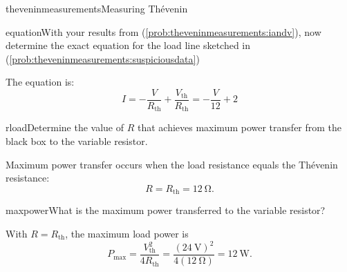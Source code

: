 \begin{mainquestion}{theveninmeasurements}{Measuring Thévenin}
\begin{partquestion}{equation}{With your results from (\cref{prob:theveninmeasurements:iandv}), now determine the exact equation for the load line sketched in (\cref{prob:theveninmeasurements:suspiciousdata}) }
\begin{answer}
The equation is:
\[
    I=-\frac{V}{R_\mathrm{th}}+\frac{V_\mathrm{th}}{R_\mathrm{th}}
      =-\frac{V}{12}+2
  \]
\end{answer}
\end{partquestion}
\begin{partquestion}{rload}{Determine the value of $R$ that achieves maximum power transfer from the black box to the variable resistor.}
\begin{answer}
Maximum power transfer occurs when the load resistance equals the Th\'evenin
  resistance:
  \[
    \boxed{R=R_{\mathrm{th}}=\qty{12}{\ohm}.}
  \]
\end{answer}
\end{partquestion}
\begin{partquestion}{maxpower}{What is the maximum power transferred to the variable resistor?}
\begin{answer}
 With $R=R_{\mathrm{th}}$, the maximum load power is
  \[
    P_{\max}=\frac{V_{\mathrm{th}}^2}{4R_{\mathrm{th}}}
      =\frac{(\qty{24}{\volt})^2}{4(\qty{12}{\ohm})}
      =\boxed{\qty{12}{\watt}}.
  \]
\end{answer}
\end{partquestion}

\end{mainquestion}